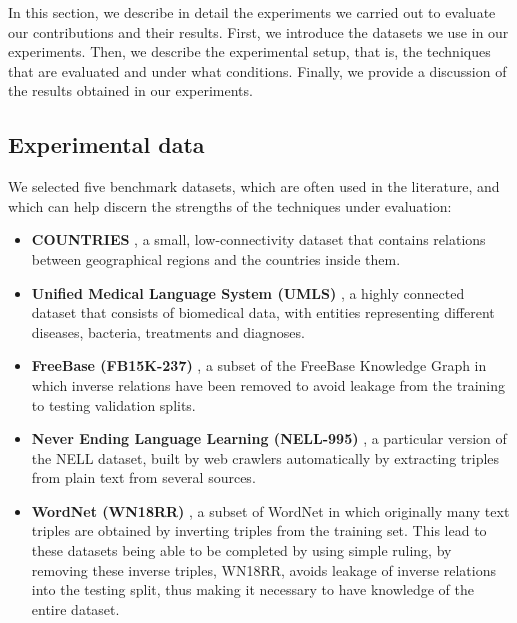 In this section, we describe in detail the experiments we carried out to evaluate our contributions and their results. First, we introduce the datasets we use in our experiments. Then, we describe the experimental setup, that is, the techniques that are evaluated and under what conditions. Finally, we provide a discussion of the results obtained in our experiments.


\subsection{Experimental data}

We selected five benchmark datasets, which are often used in the literature, and which can help discern the strengths of the techniques under evaluation:

\begin{itemize}
    \item \textbf{COUNTRIES}
    , a small, low-connectivity dataset that contains relations between geographical regions and the countries inside them.
    
    \item \textbf{Unified Medical Language System (UMLS)}
    , a highly connected dataset that consists of biomedical data, with entities representing different diseases, bacteria, treatments and diagnoses.
    
    \item \textbf{FreeBase (FB15K-237)}
    , a subset of the FreeBase Knowledge Graph in which inverse relations have been removed to avoid leakage from the training to testing validation splits.
    
    \item \textbf{Never Ending Language Learning (NELL-995)}
    , a particular version of the NELL dataset, built by web crawlers automatically by extracting triples from plain text from several sources.
    
    \item \textbf{WordNet (WN18RR)}
    , a subset of WordNet in which originally many text triples are obtained by inverting triples from the training set.
    This lead to these datasets being able to be completed by using simple ruling, by removing these inverse triples, WN18RR, avoids leakage of inverse relations into the testing split, thus making it necessary to have knowledge of the entire dataset.
\end{itemize}

